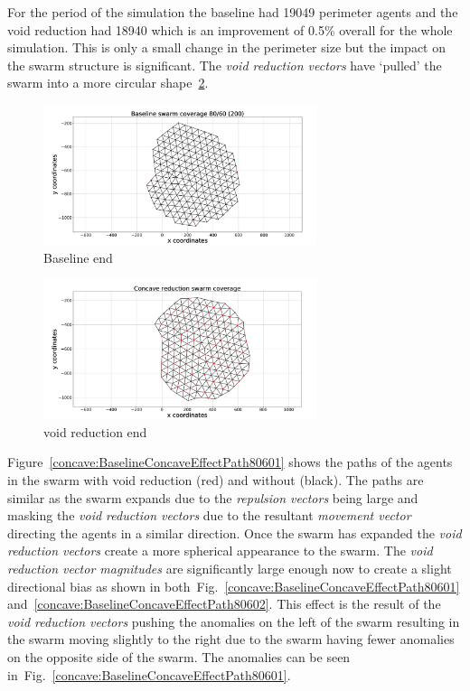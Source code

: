 \documentclass[preprint,12pt]{elsarticle}
\begin{document}
For the period of the simulation the baseline had 19049 perimeter agents and the void reduction had 18940 which is an improvement of 0.5\% overall for the whole simulation. This is only a small change in the perimeter size but the impact on the swarm structure is significant. The \textit{void reduction vectors} have `pulled' the swarm into a more circular shape~\ref{fig:ConcaveEndPoint}.
\begin{figure}
\begin{center}
\includegraphics[width=8cm]{figures/Baseline8060End}
\end{center}
\caption{Baseline end\label{fig:BaselineEndPoint}}
\end{figure}
\begin{figure}
\begin{center}
\includegraphics[width=8cm]{figures/Concave8060End}
\end{center}
\caption{void reduction end\label{fig:ConcaveEndPoint}}
\end{figure}

Figure~\ref{concave:BaselineConcaveEffectPath80601} shows the paths of the agents in the swarm with void reduction (red) and without (black). The paths are similar as the swarm expands due to the \textit{repulsion vectors} being large and masking the \textit{void reduction vectors} due to the resultant \textit{movement vector} directing the agents in a similar direction. Once the swarm has expanded the \textit{void reduction vectors} create a more spherical appearance to the swarm. The \textit{void reduction vector magnitudes} are significantly large enough now to create a slight directional bias as shown in both~Fig.~\ref{concave:BaselineConcaveEffectPath80601} and~\ref{concave:BaselineConcaveEffectPath80602}. This effect is the result of the \textit{void reduction vectors} pushing the anomalies on the left of the swarm resulting in the swarm moving slightly to the right due to the swarm having fewer anomalies on the opposite side of the swarm. The anomalies can be seen in~Fig.~\ref{concave:BaselineConcaveEffectPath80601}.
\end{document}
